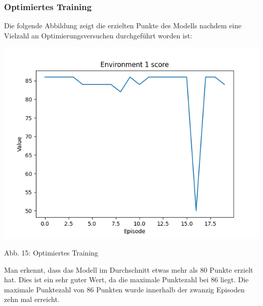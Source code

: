\subsubsection{Optimiertes Training}
\begin{minipage}{\linewidth}
	Die folgende Abbildung zeigt die erzielten Punkte des Modells nachdem eine Vielzahl an Optimierungsversuchen durchgeführt worden ist:
	
	\vspace{0.5cm}
	\includegraphics[width=1\textwidth]{Bilder/optimizetraining}
	
	Abb. 15: Optimiertes Training\\
\end{minipage}
Man erkennt, dass das Modell im Durchschnitt etwas mehr als 80 Punkte erzielt hat. Dies ist ein sehr guter Wert, da die maximale Punktezahl bei 86 liegt. Die maximale Punktezahl von 86 Punkten wurde innerhalb der zwanzig Episoden zehn mal erreicht.
